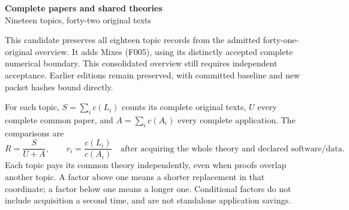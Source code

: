 \documentclass[11pt,a4paper]{article}
\begin{document}
\begin{center}\Large\textbf{Complete papers and shared theories}\\[4pt]
\normalsize Nineteen topics, forty-two original texts\end{center}
This candidate preserves all eighteen topic records from the admitted forty-one-original overview. It adds Mixes (F005), using its distinctly accepted complete numerical boundary. This consolidated overview still requires independent acceptance. Earlier editions remain preserved, with committed baseline and new packet hashes bound directly.

For each topic, $S=\sum_i c(L_i)$ counts its complete original texts, $U$ every complete common paper, and $A=\sum_i c(A_i)$ every complete application. The comparisons are
\[
 R=\frac{S}{U+A},\qquad r_i=\frac{c(L_i)}{c(A_i)}
 \quad\text{after acquiring the whole theory and declared software/data.}
\]
Each topic pays its common theory independently, even when proofs overlap another topic. A factor above one means a shorter replacement in that coordinate; a factor below one means a longer one. Conditional factors do not include acquisition a second time, and are not standalone application savings.
\end{document}
